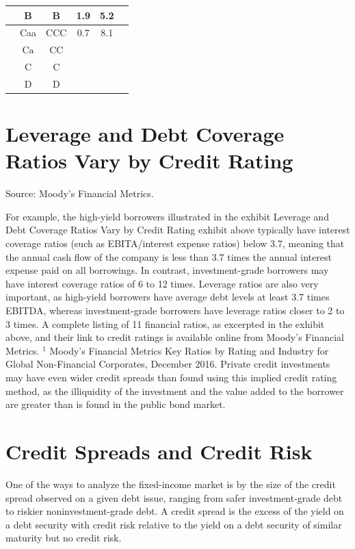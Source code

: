 \documentclass[11pt]{article}
\begin{document}
\begin{center}
\begin{tabular}{|c|c|c|c|c|c|}
{} & B & B & 1.9 & 5.2 &  \\
\hline
 & Caa & $\mathrm{CCC}$ & 0.7 & 8.1 &  \\
\hline
 & $\mathrm{Ca}$ & $\mathrm{CC}$ &  &  &  \\
\hline
 & $\mathrm{C}$ & C &  &  &  \\
\hline
 & D & D &  &  &  \\
\hline
\end{tabular}
\end{center}

\section*{Leverage and Debt Coverage Ratios Vary by Credit Rating}
Source: Moody's Financial Metrics.

For example, the high-yield borrowers illustrated in the exhibit Leverage and Debt Coverage Ratios Vary by Credit Rating exhibit above typically have interest coverage ratios (such as EBITA/interest expense ratios) below 3.7, meaning that the annual cash flow of the company is less than 3.7 times the annual interest expense paid on all borrowings. In contrast, investment-grade borrowers may have interest coverage ratios of 6 to 12 times. Leverage ratios are also very important, as high-yield borrowers have average debt levels at least 3.7 times EBITDA, whereas investment-grade borrowers have leverage ratios closer to 2 to 3 times. A complete listing of 11 financial ratios, as excerpted in the exhibit above, and their link to credit ratings is available online from Moody's Financial Metrics. ${ }^{1}$ Moody's Financial Metrics Key Ratios by Rating and Industry for Global Non-Financial Corporates, December 2016. Private credit investments may have even wider credit spreads than found using this implied credit rating method, as the illiquidity of the investment and the value added to the borrower are greater than is found in the public bond market.

\section*{Credit Spreads and Credit Risk}
One of the ways to analyze the fixed-income market is by the size of the credit spread observed on a given debt issue, ranging from safer investment-grade debt to riskier noninvestment-grade debt. A credit spread is the excess of the yield on a debt security with credit risk relative to the yield on a debt security of similar maturity but no credit risk.
\end{document}
